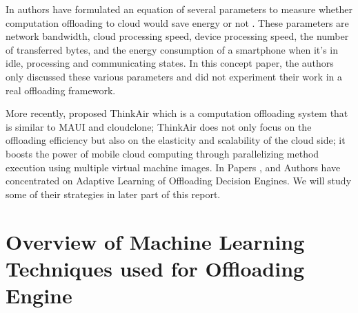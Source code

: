 \documentclass[12pt]{report}
\begin{document}
In \cite{kumar2010cloud} authors have formulated an equation of several parameters
to measure whether computation offloading to cloud would
save energy or not . These parameters are network
bandwidth, cloud processing speed, device processing
speed, the number of transferred bytes, and the energy
consumption of a smartphone when it’s in idle, processing
and communicating states. In this concept paper, the
authors only discussed these various parameters and did not
experiment their work in a real offloading framework.

More recently, \cite{kosta2012thinkair} proposed ThinkAir which is a
computation offloading system that is similar to MAUI and
cloudclone; ThinkAir does not only focus on the offloading
efficiency but also on the elasticity and scalability of the
cloud side; it boosts the power of mobile cloud computing
through parallelizing method execution using multiple
virtual machine images. 
In Papers \cite{flores2013adaptive}, \cite{khairy2013smartphone} and \cite{kemp2012cuckoo} Authors have concentrated on Adaptive Learning of Offloading Decision Engines. We will study some of their strategies in later part of this report. 

\chapter{Overview of Machine Learning Techniques used for Offloading Engine} %
\label{chap:OverviewMachineLearning}
\end{document}
